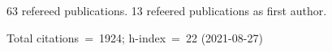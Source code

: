 63 refereed publications. 13 refeered publications as first author.

Total citations~=~1924; h-index~=~22 (2021-08-27)